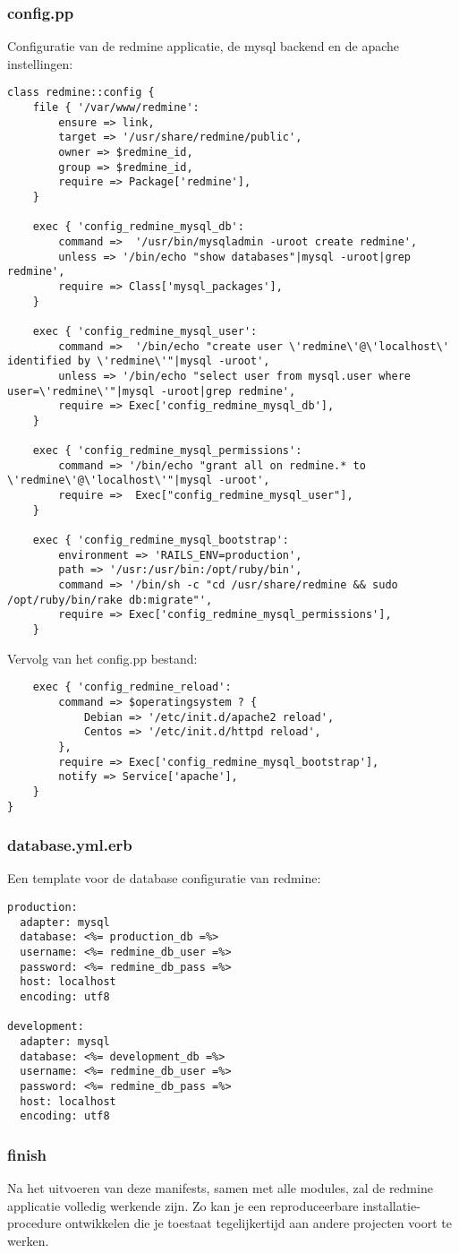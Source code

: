 \subsubsection{config.pp}
Configuratie van de redmine applicatie, de mysql backend en de apache instellingen:
%
\begin{code}
\begin{lstlisting}
class redmine::config {
	file { '/var/www/redmine':
		ensure => link,
		target => '/usr/share/redmine/public',
		owner => $redmine_id,
		group => $redmine_id,
		require => Package['redmine'],
	}

	exec { 'config_redmine_mysql_db':
		command =>  '/usr/bin/mysqladmin -uroot create redmine',
		unless => '/bin/echo "show databases"|mysql -uroot|grep redmine',
		require => Class['mysql_packages'],
	}

	exec { 'config_redmine_mysql_user':
		command =>  '/bin/echo "create user \'redmine\'@\'localhost\' identified by \'redmine\'"|mysql -uroot',
		unless => '/bin/echo "select user from mysql.user where user=\'redmine\'"|mysql -uroot|grep redmine',
		require => Exec['config_redmine_mysql_db'],
	}

	exec { 'config_redmine_mysql_permissions':
		command => '/bin/echo "grant all on redmine.* to \'redmine\'@\'localhost\'"|mysql -uroot',
		require =>  Exec["config_redmine_mysql_user"],
	}

	exec { 'config_redmine_mysql_bootstrap':
		environment => 'RAILS_ENV=production',
		path => '/usr:/usr/bin:/opt/ruby/bin',
		command => '/bin/sh -c "cd /usr/share/redmine && sudo /opt/ruby/bin/rake db:migrate"',
		require => Exec['config_redmine_mysql_permissions'],
	}
\end{lstlisting}
\end{code}
%
Vervolg van het config.pp bestand:
\begin{code}
\begin{lstlisting}
	exec { 'config_redmine_reload':
		command => $operatingsystem ? {
			Debian => '/etc/init.d/apache2 reload',
			Centos => '/etc/init.d/httpd reload',
		},
		require => Exec['config_redmine_mysql_bootstrap'],
		notify => Service['apache'],
	}
}
\end{lstlisting}
\end{code}
%
\subsubsection{database.yml.erb}
%
Een template voor de database configuratie van redmine:
%
\begin{code}
\begin{lstlisting}
production:
  adapter: mysql
  database: <%= production_db =%>
  username: <%= redmine_db_user =%>
  password: <%= redmine_db_pass =%>
  host: localhost
  encoding: utf8

development:
  adapter: mysql
  database: <%= development_db =%>
  username: <%= redmine_db_user =%>
  password: <%= redmine_db_pass =%>
  host: localhost
  encoding: utf8
\end{lstlisting}
\end{code}
%
\subsubsection{finish}
Na het uitvoeren van deze manifests, samen met alle modules, zal de redmine applicatie volledig werkende zijn. Zo kan je een reproduceerbare installatie-procedure ontwikkelen die je toestaat tegelijkertijd aan andere projecten voort te werken.
